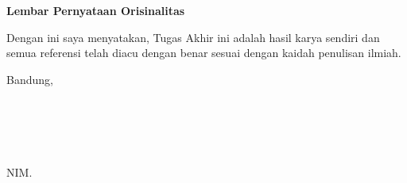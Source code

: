\clearpage
\pagestyle{empty}

\begin{center}
    {\Large \bfseries Lembar Pernyataan Orisinalitas}
\end{center}
\vspace{15mm}

Dengan ini saya menyatakan, Tugas Akhir ini adalah hasil karya sendiri dan semua referensi telah diacu dengan benar sesuai dengan kaidah penulisan ilmiah.
\vspace{15mm}

Bandung, \thedate{} \yearsidang{} \\
\\
\\
\\
\\
\underline{\theauthor}\\
NIM. \nim
\clearpage